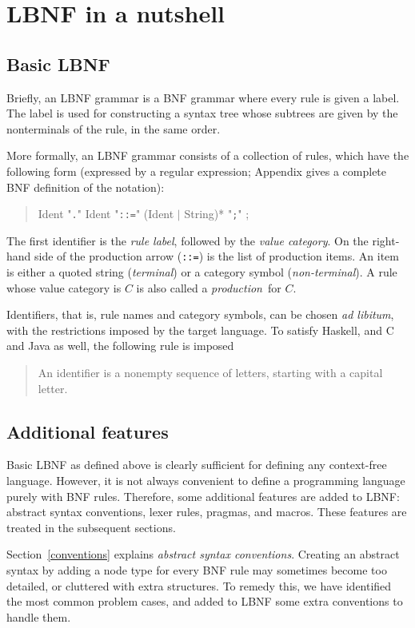 \documentclass[10pt]{article}
\newcommand{\bequ}{\begin{quote}}
\newcommand{\enqu}{\end{quote}}
\begin{document}
\section{LBNF in a nutshell}

\subsection{Basic LBNF}

Briefly, an LBNF grammar is a BNF grammar where every rule is given a label.
The label is used for constructing a syntax tree whose subtrees are
given by the nonterminals of the rule, in the same order.

More formally, an LBNF grammar consists of a collection of rules,
which have the following form (expressed by a regular expression;
Appendix gives a complete BNF definition of the notation):
\bequ
  Ident "{\tt .}" Ident "{\tt ::=}" (Ident $\mid$ String)* "{\tt;}" ;
\enqu
The first identifier is the \textit{rule label}, followed by the
\textit{value category}. On the right-hand side of the production
arrow ({\tt ::=}) is the list of production items. An item is either
a quoted string (\textit{terminal}) or a category symbol (\textit{non-terminal}).
A rule whose value category is $C$ is also called a \textit{production}\ for $C$.

Identifiers, that is, rule names and category symbols, can be
chosen {\em ad libitum}, with the restrictions imposed by the target language. To
satisfy Haskell, and C and Java as well, the following rule is imposed
\bequ
An identifier is a nonempty sequence of letters, starting with a
capital letter.
\enqu


\subsection{Additional features}

Basic LBNF as defined above
is clearly sufficient for defining any context-free language. However,
it is not always convenient to define a programming language purely with BNF rules.
Therefore, some additional features are added to LBNF: abstract syntax conventions,
lexer rules, pragmas, and macros. These features are treated in the
subsequent sections.

Section~\ref{conventions} explains {\em abstract syntax conventions}.
Creating an abstract syntax by adding a node type for every BNF rule
may sometimes become too detailed,
or cluttered with extra structures.
To remedy this, we have identified the most common problem cases,
and added to LBNF
some extra conventions to handle them.
\end{document}
